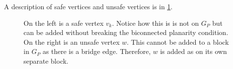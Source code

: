 A description of safe vertices and unsafe vertices is in \cref{fig:safe_vertices}.

\begin{figure}[h!]
	\centering
	
	\caption[Safe and unsafe vertices]{On the left is a safe vertex $v_k$. Notice how this is is not on $G_P$ but can be added without breaking the biconnected planarity condition. On the right is an unsafe vertex $w$. This cannot be added to a block in $G_P$ as there is a bridge edge. Therefore, $w$ is added as on its own separate block.}
	\label{fig:safe_vertices}
\end{figure}





